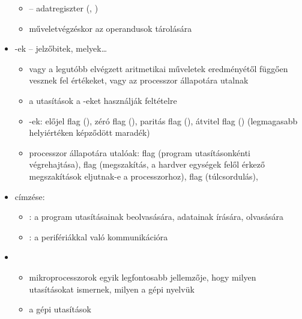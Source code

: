 \documentclass[main.tex]{subfiles}
\begin{document}
\begin{itemize}
\begin{itemize}
      \item {} – adatregiszter
      (, )

      \item műveletvégzéskor az operandusok tárolására
    \end{itemize}

    \item {}-ek – jelzőbitek, melyek\dots
    \begin{itemize}
      \item vagy a legutóbb elvégzett aritmetikai
      műveletek eredményétől függően vesznek fel értékeket,
      vagy az processzor állapotára utalnak

      \item a  utasítások
      a -eket használják feltételre

      \item {}-ek:
      előjel flag (),
      zéró flag (),
      paritás flag (),
      átvitel flag ()
      (legmagasabb helyiértéken képződött maradék)

      \item processzor állapotára utalóak:
       flag (program utasításonkénti végrehajtása),
       flag (megszakítás,
      a hardver egységek felől érkező megszakítások
      eljutnak-e a processzorhoz),
       flag (túlcsordulás),
    \end{itemize}

    \item {} címzése:
    \begin{itemize}
      \item {}:
      a program utasításainak beolvasására,
      adatainak írására, olvasására

      \item {}:
      a perifériákkal való kommunikációra
    \end{itemize}

    \item {}
    \begin{itemize}
      \item mikroprocesszorok egyik legfontosabb jellemzője,
      hogy milyen utasításokat ismernek, milyen a gépi nyelvük

      \item a gépi utasítások 
      

\end{itemize}
\end{itemize}
\end{document}
